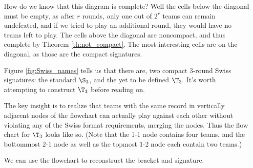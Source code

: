 {    How do we know that this diagram is complete? Well the cells below the diagonal must be empty, as after $r$ rounds, only one out of $2^r$ teams can remain undefeated, and if we tried to play an additional round, they would have no teams left to play. The cells above the diagonal are noncompact, and thus complete by Theorem \ref{th:not_compact}. The most interesting cells are on the diagonal, as those are the compact signatures.


    Figure \ref{fig:Swiss_names} tells us that there are, two compact 3-round Swiss signatures: the standard $\S_3$, and the yet to be defined $\T_3.$ It's worth attempting to construct $\T_3$ before reading on.

    The key insight is to realize that teams with the same record in vertically adjacent nodes of the flowchart can actually play against each other without violating any of the Swiss format requirements, merging the nodes. Thus the flow chart for $\T_3$ looks like so. (Note that the 1-1 node contains four teams, and the bottommost 2-1 node as well as the topmost 1-2 node each contain two teams.)


    We can use the flowchart to reconstruct the bracket and signature.


}
